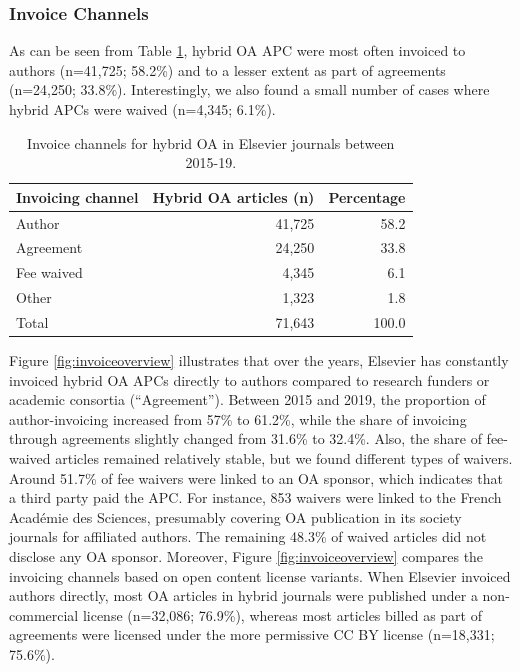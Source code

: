 \documentclass[a4paper,man,floatsintext,longtable,noextraspace,12pt]{apa6}
\begin{document}
\hypertarget{invoice-channels}{%
\subsubsection*{Invoice Channels}\label{invoice-channels}}

As can be seen from Table \ref{tab:invoicing_overview}, hybrid OA APC
were most often invoiced to authors (n=41,725; 58.2\%) and to a lesser
extent as part of agreements (n=24,250; 33.8\%). Interestingly, we also
found a small number of cases where hybrid APCs were waived (n=4,345;
6.1\%).

\begin{table}

\caption{\label{tab:invoicing_overview}Invoice channels for hybrid OA in Elsevier journals between 2015-19.}
\centering
\begin{tabular}[t]{lrr}
\toprule
Invoicing channel & Hybrid OA articles (n) & Percentage\\
\midrule
Author & 41,725 & 58.2\\
Agreement & 24,250 & 33.8\\
Fee waived & 4,345 & 6.1\\
Other & 1,323 & 1.8\\
\midrule
Total & 71,643 & 100.0\\
\bottomrule
\end{tabular}
\end{table}

Figure \ref{fig:invoiceoverview} illustrates that over the years,
Elsevier has constantly invoiced hybrid OA APCs directly to authors
compared to research funders or academic consortia (``Agreement'').
Between 2015 and 2019, the proportion of author-invoicing increased from
57\% to 61.2\%, while the share of invoicing through agreements slightly
changed from 31.6\% to 32.4\%. Also, the share of fee-waived articles
remained relatively stable, but we found different types of waivers.
Around 51.7\% of fee waivers were linked to an OA sponsor, which
indicates that a third party paid the APC. For instance, 853 waivers
were linked to the French Académie des Sciences, presumably covering OA
publication in its society journals for affiliated authors. The
remaining 48.3\% of waived articles did not disclose any OA sponsor.
Moreover, Figure \ref{fig:invoiceoverview} compares the invoicing
channels based on open content license variants. When Elsevier invoiced
authors directly, most OA articles in hybrid journals were published
under a non-commercial license (n=32,086; 76.9\%), whereas most articles
billed as part of agreements were licensed under the more permissive CC
BY license (n=18,331; 75.6\%).
\end{document}
